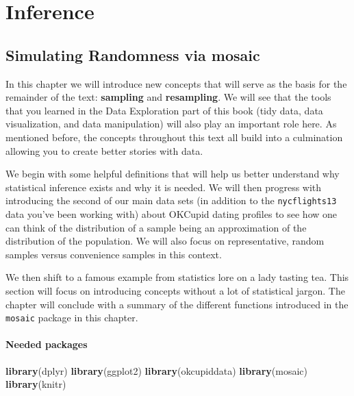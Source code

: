 \documentclass[]{tufte-book}
\newenvironment{Shaded}{\begin{snugshade}}{\end{snugshade}}
\newcommand{\KeywordTok}[1]{\textcolor[rgb]{0.13,0.29,0.53}{\textbf{{#1}}}}
\newcommand{\NormalTok}[1]{{#1}}
\theoremstyle{definition}
\theoremstyle{definition}
\theoremstyle{remark}
\begin{document}
\part{Inference}\label{part-inference}

\chapter{Simulating Randomness via mosaic}\label{sim}

In this chapter we will introduce new concepts that will serve as the
basis for the remainder of the text: \textbf{sampling} and
\textbf{resampling}. We will see that the tools that you learned in the
Data Exploration part of this book (tidy data, data visualization, and
data manipulation) will also play an important role here. As mentioned
before, the concepts throughout this text all build into a culmination
allowing you to create better stories with data.

We begin with some helpful definitions that will help us better
understand why statistical inference exists and why it is needed. We
will then progress with introducing the second of our main data sets (in
addition to the \texttt{nycflights13} data you've been working with)
about OKCupid dating profiles to see how one can think of the
distribution of a sample being an approximation of the distribution of
the population. We will also focus on representative, random samples
versus convenience samples in this context.

We then shift to a famous example from statistics lore on a lady tasting
tea. This section will focus on introducing concepts without a lot of
statistical jargon. The chapter will conclude with a summary of the
different functions introduced in the \texttt{mosaic} package in this
chapter.

\subsection*{Needed packages}\label{needed-packages-3}

\begin{Shaded}
\begin{Highlighting}[]
\KeywordTok{library}\NormalTok{(dplyr)}
\KeywordTok{library}\NormalTok{(ggplot2)}
\KeywordTok{library}\NormalTok{(okcupiddata)}
\KeywordTok{library}\NormalTok{(mosaic)}
\KeywordTok{library}\NormalTok{(knitr)}
\end{Highlighting}
\end{Shaded}
\end{document}
